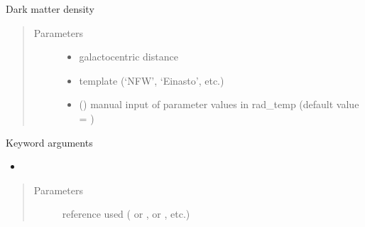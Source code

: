 \documentclass[letterpaper,10pt,english]{sphinxmanual}
\begin{document}
\begin{fulllineitems}
\label{\detokenize{diffsph.profiles:diffsph.profiles.massmodels.rho}}
\sphinxAtStartPar
Dark matter density
\begin{quote}\begin{description}
\item[{Parameters}] \leavevmode\begin{itemize}
\item {} 
\sphinxAtStartPar
{} \textendash{} galactocentric distance

\item {} 
\sphinxAtStartPar
{} \textendash{} template (‘NFW’, ‘Einasto’, etc.)

\item {} 
\sphinxAtStartPar
{} () \textendash{} manual input of parameter values in rad\_temp (default value = )

\end{itemize}

\end{description}\end{quote}

\sphinxAtStartPar
Keyword arguments
\begin{itemize}
\item {} 
\sphinxAtStartPar
{}

\end{itemize}
\begin{quote}\begin{description}
\item[{Parameters}] \leavevmode
\sphinxAtStartPar
{} \textendash{} reference used ( or \sphinxcode{\sphinxupquote{\textquotesingle{}1309.2641\textquotesingle{}}},  or \sphinxcode{\sphinxupquote{\textquotesingle{}1408.0002\textquotesingle{}}}, etc.)


\end{description}
\end{quote}
\end{fulllineitems}
\end{document}
